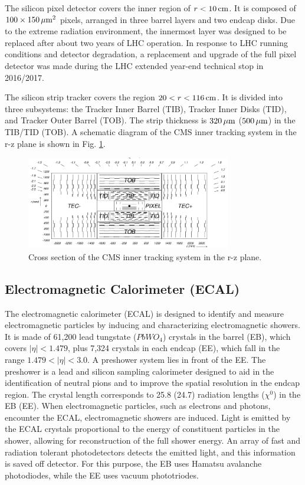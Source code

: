 The silicon pixel detector covers the inner region of $r < 10 \,\text{cm}$. It is composed of $100 \times 150 \,\mu\text{m}^{2}$ pixels, arranged in three barrel layers and two endcap disks. Due to the extreme 
radiation environment, the innermost layer was designed to be replaced after about two years of LHC operation. 
In response to LHC running conditions and detector degradation, a replacement and upgrade of the full pixel detector was made during the LHC extended year-end technical stop in 2016/2017. 

The silicon strip tracker covers the region $20 < r < 116 \,\text{cm}$. It is divided into three subsystems: the Tracker Inner Barrel (TIB), Tracker Inner Disks (TID), and Tracker Outer Barrel (TOB). 
The strip thickness is $320 \,\mu\text{m}$ ($500 \,\mu\text{m}$) in the TIB/TID (TOB). A schematic diagram of the CMS inner tracking system in the r-z plane is shown in Fig. \ref{fig:cms_tracker}.

\begin{figure}[tb]
  \centering
   \includegraphics[width=0.8\textwidth]{fig/experiment/detector/cms_tracker.png}
	\caption[Cross section of the CMS inner tracking system in the r-z plane.]{Cross section of the CMS inner tracking system in the r-z plane.~\cite{CMS:2008xjf}}
	\label{fig:cms_tracker}
\end{figure}


\subsection{Electromagnetic Calorimeter (ECAL)}
The electromagnetic calorimeter (ECAL) is designed to identify and measure electromagnetic particles by inducing and characterizing electromagnetic showers. 
It is made of 61,200 lead tungstate ($PbWO_4$) crystals in the barrel (EB), which covers $|\eta| < 1.479$, plus 7,324 crystals in each endcap (EE), which fall in the range $1.479 < |\eta| < 3.0$. A preshower system lies in front of the EE. The preshower is a lead and silicon sampling calorimeter designed to aid in the identification of neutral pions and to improve the spatial resolution in the 
endcap region. 
The crystal length corresponds to 25.8 (24.7) radiation lengths ($\chi^{0}$) in the EB (EE). When electromagnetic particles, such as 
electrons and photons, encounter the ECAL, electromagnetic showers are induced. Light is emitted by the ECAL crystals proportional to the energy of constituent particles in the shower, allowing 
for reconstruction of the full shower energy. An array of fast and radiation tolerant photodetectors detects the emitted light, and this information is saved off detector. 
For this purpose, the EB uses Hamatsu avalanche photodiodes, while the EE uses vacuum phototriodes. 



